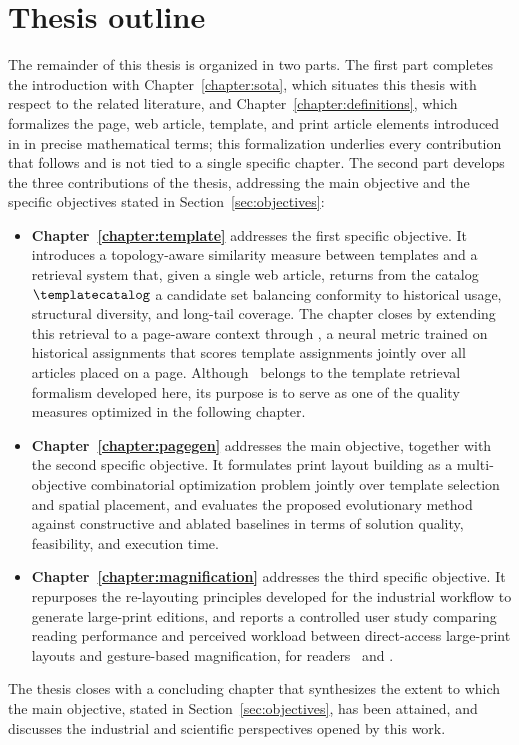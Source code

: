 \section{Thesis outline}
\label{sec:thesis-outline}

The remainder of this thesis is organized in two parts. The first part completes the introduction with Chapter~\ref{chapter:sota}, which situates this thesis with respect to the related literature, and Chapter~\ref{chapter:definitions}, which formalizes the page, web article, template, and print article elements introduced in  in precise mathematical terms; this formalization underlies every contribution that follows and is not tied to a single specific chapter. The second part develops the three contributions of the thesis, addressing the main objective and the specific objectives stated in Section~\ref{sec:objectives}:

\begin{itemize}
    \item \textbf{Chapter~\ref{chapter:template}} addresses the first specific objective. It introduces a topology-aware similarity measure between templates and a retrieval system that, given a single web article, returns from the catalog $\templatecatalog$ a candidate set balancing conformity to historical usage, structural diversity, and long-tail coverage. The chapter closes by extending this retrieval to a page-aware context through \neuralmethod, a neural metric trained on \melody historical assignments that scores template assignments jointly over all articles placed on a page. Although \neuralmethod\ belongs to the template retrieval formalism developed here, its purpose is to serve as one of the quality measures optimized in the following chapter.

    \item \textbf{Chapter~\ref{chapter:pagegen}} addresses the main objective, together with the second specific objective. It formulates print layout building as a multi-objective combinatorial optimization problem jointly over template selection and spatial placement, and evaluates the proposed evolutionary method against constructive and ablated baselines in terms of solution quality, feasibility, and execution time.

    \item \textbf{Chapter~\ref{chapter:magnification}} addresses the third specific objective. It repurposes the re-layouting principles developed for the industrial workflow to generate large-print editions, and reports a controlled user study comparing reading performance and perceived workload between direct-access large-print layouts and gesture-based magnification, for readers \NV\ and \LV.
\end{itemize}

The thesis closes with a concluding chapter that synthesizes the extent to which the main objective, stated in Section~\ref{sec:objectives}, has been attained, and discusses the industrial and scientific perspectives opened by this work.

